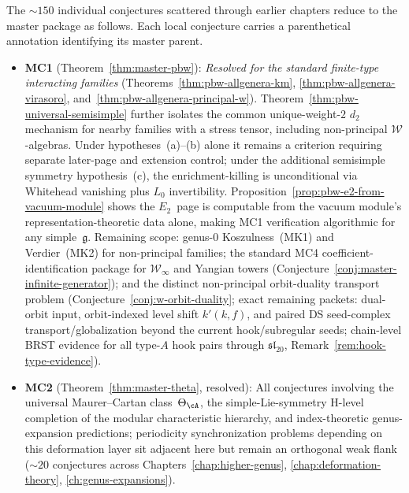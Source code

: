 \begin{remark}\label{rem:conjecture-dependencies}
The ${\sim}150$ individual conjectures scattered through earlier
chapters reduce to the master package as follows.
Each local conjecture carries a parenthetical annotation identifying
its master parent.
\begin{itemize}
\item \textbf{MC1} (Theorem~\ref{thm:master-pbw}):
  \emph{Resolved for the standard finite-type interacting families}
  (Theorems~\ref{thm:pbw-allgenera-km},
  \ref{thm:pbw-allgenera-virasoro},
  and~\ref{thm:pbw-allgenera-principal-w}).
  Theorem~\ref{thm:pbw-universal-semisimple} further isolates the
  common unique-weight-$2$ $d_2$ mechanism for nearby families with a
  stress tensor, including non-principal $\mathcal{W}$-algebras.
  Under hypotheses~(a)--(b) alone it remains a criterion requiring
  separate later-page and extension control; under the additional
  semisimple symmetry hypothesis~(c), the enrichment-killing is
  unconditional via Whitehead vanishing plus $L_0$ invertibility.
  Proposition~\ref{prop:pbw-e2-from-vacuum-module} shows the
  $E_2$~page is computable from the vacuum module's
  representation-theoretic data alone, making MC1 verification
  algorithmic for any simple~$\mathfrak{g}$.
  Remaining scope: genus-$0$ Koszulness~(MK1) and
  Verdier~(MK2) for non-principal families;
  the standard MC4 coefficient-identification package for
  $\mathcal{W}_\infty$ and Yangian towers
  (Conjecture~\ref{conj:master-infinite-generator});
  and the distinct non-principal orbit-duality transport problem
  (Conjecture~\ref{conj:w-orbit-duality}; exact remaining packets:
  dual-orbit input, orbit-indexed level shift $k'(k,f)$, and paired
  DS seed-complex transport/globalization beyond the current
  hook/subregular seeds; chain-level
  BRST evidence for all type-$A$ hook pairs through
  $\mathfrak{sl}_{20}$, Remark~\ref{rem:hook-type-evidence}).
\item \textbf{MC2} (Theorem~\ref{thm:master-theta}, resolved):
  All conjectures involving the universal Maurer--Cartan class~$\Theta_{\cA}$,
  the simple-Lie-symmetry H-level completion of the modular
  characteristic hierarchy,
  and index-theoretic genus-expansion predictions; periodicity
  synchronization problems depending on this deformation layer sit
  adjacent here but remain an orthogonal weak flank (${\sim}20$
  conjectures across Chapters~\ref{chap:higher-genus},
  \ref{chap:deformation-theory}, \ref{ch:genus-expansions}).

\end{itemize}
\end{remark}
